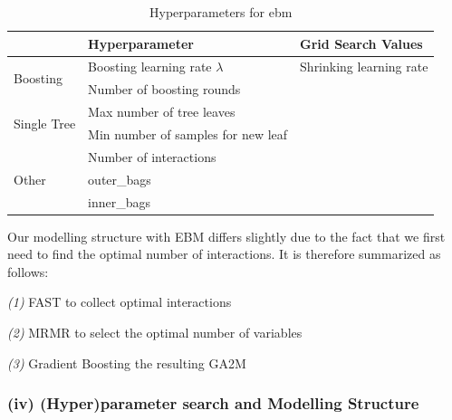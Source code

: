 \documentclass[12pt,titlepage]{article}
\begin{document}
\begin{table} \label{hp_lgbm}
    \centering
    \caption{Hyperparameters for ebm}
    \begin{tabular}{l|l|l|}
    \hline
    \multicolumn{1}{l|}{}                                       & Hyperparameter                            & Grid Search Values       \\
    \hline
    \multirow{2}{*}{Boosting}                         & Boosting learning rate $\lambda$                                                                & Shrinking learning rate  \\
    & Number of boosting rounds            &                          \\
    \hline
    \multicolumn{1}{l|}{\multirow{2}{*}{Single Tree}} & Max number of tree leaves          &                          \\
    \multicolumn{1}{l|}{}                                       & Min number of samples for new leaf   &                          \\
    \hline
    \multicolumn{1}{l|}{\multirow{3}{*}{Other}} & Number of interactions          &                          \\
    \multicolumn{1}{l|}{}                                       & outer\_bags   &                          \\
    \multicolumn{1}{l|}{}                                       & inner\_bags   &                          \\
    \hline
    \end{tabular}
\end{table}

Our modelling structure with EBM differs slightly due to the fact that we first need to find the optimal number of interactions. It is therefore summarized as follows:

\vspace{3mm}
\textit{(1)} FAST to collect optimal interactions \par
\textit{(2)} MRMR to select the optimal number of variables \par
\textit{(3)} Gradient Boosting the resulting GA2M \\

\subsubsection*{(iv) (Hyper)parameter search and Modelling Structure}
\end{document}
